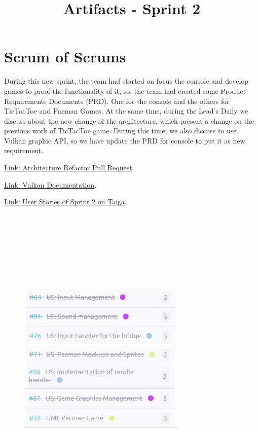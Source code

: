 \documentclass{article}
\title{Artifacts - Sprint 2}
\date{}
\begin{document}
\maketitle

\hypertarget{sos-s2} {
\section{Scrum of Scrums}\label{Scrum of Scrums} 
During this new sprint, the team had started on focus the console and develop 
games to proof the functionality of it, so, the team had created some Product 
Requirements Documents (PRD). One for the console and the others for TicTacToe 
and Pacman Games.
At the same time, during the Lead's Daily we discuss about the new change of 
the architecture, which present a change on the previous work of TicTacToe game. 
During this time, we also discuss to use Vulkan graphic API, so we have update 
the PRD for console to put it as new requirement.
}

\href{https://github.com/Pending-Name-21/arquitecture/pull/5/files}{Link: Architecture Refactor Pull Request}.

\href{https://docs.vulkan.org/tutorial/latest/02_Development_environment.html#_linux}{Link: Vulkan Documentation}.

\href{https://tree.taiga.io/project/joseluis-teran-coffeetime/taskboard/sprint-2-12274}{Link: User Stories of Sprint 2 on Taiga}.

\begin{figure}
\centering
\includegraphics[width=8cm, height=15cm]{./assets/us-s2.png}
\end{figure}
\end{document}
